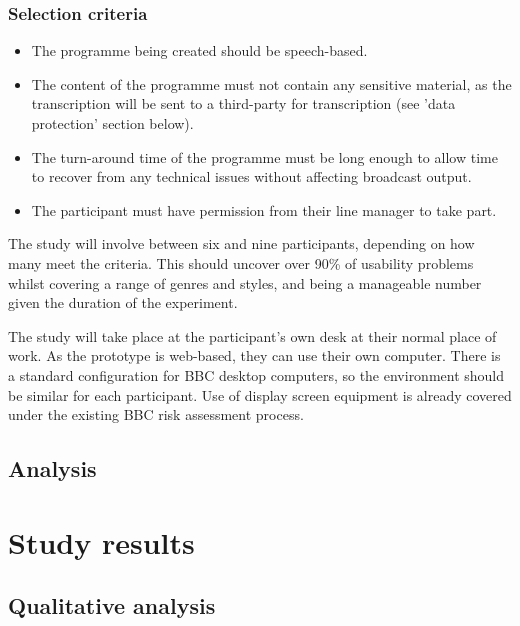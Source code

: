 \subsubsection{Selection criteria}

\begin{itemize}
\item The programme being created should be speech-based.
\item The content of the programme must not contain any sensitive material, as the transcription will be sent to a
  third-party for transcription (see 'data protection' section below).
\item The turn-around time of the programme must be long enough to allow time to recover from any technical issues
  without affecting broadcast output.
\item The participant must have permission from their line manager to take part.
\end{itemize}

The study will involve between six and nine participants, depending on how many meet the criteria. This should uncover
over 90\% of usability problems \citep{Nielsen1993} whilst covering a range of genres and styles, and being a
manageable number given the duration of the experiment.

The study will take place at the participant's own desk at their normal place of work. As the prototype is web-based,
they can use their own computer. There is a standard configuration for BBC desktop computers, so the environment should
be similar for each participant. Use of display screen equipment is already covered under the existing BBC risk
assessment process.

\subsection{Analysis}


\section{Study results}\label{sec:paper-results}

\subsection{Qualitative analysis}



